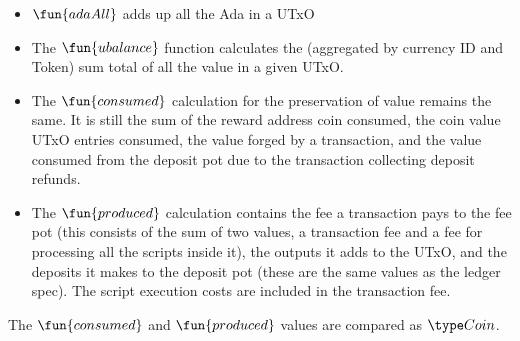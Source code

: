 \begin{itemize}
  \item $\fun{adaAll}$ adds up all the Ada in a UTxO

  \item
    The $\fun{ubalance}$ function calculates the (aggregated by currency ID and
    Token) sum total of all the value in a given UTxO.

  \item The $\fun{consumed}$ calculation for the preservation of value remains the
  same. It is still the sum of the reward address coin consumed, the coin value
   UTxO entries consumed, the value forged by a transaction,
   and the value consumed from the deposit pot due
   to the transaction collecting deposit refunds.

  \item The $\fun{produced}$ calculation contains the fee a transaction pays
  to the fee pot (this consists of the sum of two values, a transaction fee and a
  fee for processing all the scripts inside it), the outputs it adds to the UTxO,
  and the deposits it makes
  to the deposit pot (these are the same values as the ledger spec).
  The script execution costs are included in the transaction fee.
\end{itemize}

The $\fun{consumed}$ and $\fun{produced}$ values are compared as $\Coin$.

